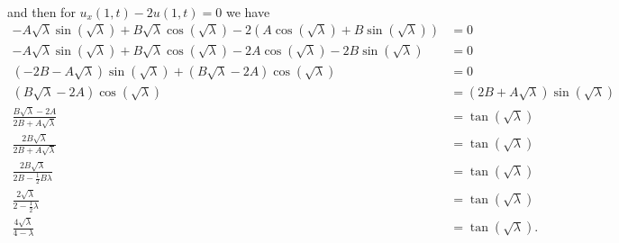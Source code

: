 \documentclass[10pt]{amsart}
\theoremstyle{nonumberplain}
\begin{document}
\begin{enumerate}[label={\bf {\arabic*}:}]
\begin{align*}
\end{align*}
and then for $u_x(1, t) - 2u(1, t) = 0$ we have
\begin{align*}
-A \sqrt \lambda \sin(\sqrt \lambda ) + B \sqrt \lambda \cos(\sqrt \lambda ) - 2 \left(  A\cos(\sqrt \lambda) + B\sin(\sqrt \lambda ) \right) &= 0 \\
-A \sqrt \lambda \sin(\sqrt \lambda ) + B \sqrt \lambda \cos(\sqrt \lambda ) - 2 A\cos(\sqrt \lambda) - 2B\sin(\sqrt \lambda ) &= 0 \\
(- 2B - A \sqrt \lambda) \sin(\sqrt \lambda ) + (B \sqrt \lambda - 2A) \cos(\sqrt \lambda ) &= 0 \\
(B \sqrt \lambda - 2A) \cos(\sqrt \lambda ) &= (2B + A \sqrt \lambda) \sin(\sqrt \lambda ) \\
\frac {B \sqrt \lambda - 2A}{2B + A \sqrt \lambda} &= \tan(\sqrt \lambda ) \\
\frac {2 B \sqrt \lambda}{2B + A \sqrt \lambda} &= \tan(\sqrt \lambda ) \\
\frac {2 B \sqrt \lambda}{2B - \frac 1 2 B  \lambda} &= \tan(\sqrt \lambda ) \\
\frac {2 \sqrt \lambda}{2 - \frac 1 2  \lambda} &= \tan(\sqrt \lambda ) \\
\frac {4 \sqrt \lambda}{4 - \lambda} &= \tan(\sqrt \lambda ).
\end{align*}


\end{enumerate}
\end{document}
